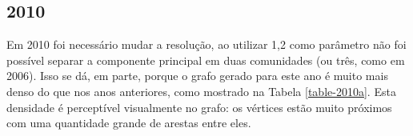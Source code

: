 \subsection{2010}
\label{resultados__grafos--2010}

Em 2010 foi necessário mudar a resolução, ao utilizar 1,2 como parâmetro não foi possível separar a componente principal em duas comunidades (ou três, como em 2006). Isso se dá, em parte, porque o grafo gerado para este ano é muito mais denso do que nos anos anteriores, como mostrado na Tabela \ref{table-2010a}. Esta densidade é perceptível visualmente no grafo: os vértices estão muito próximos com uma quantidade grande de arestas entre eles. 

\begin{figure}[h]
\center
    \qquad
    

\end{figure}
